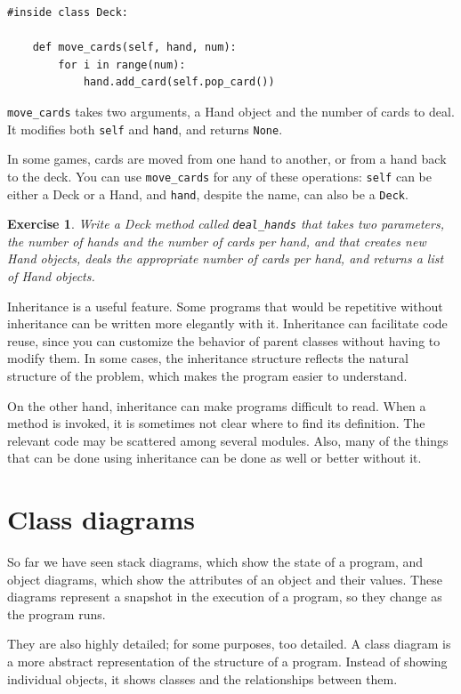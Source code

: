 \documentclass[12pt,a4paper,final,twoside,onecolumn,titlepage]{book}
\newtheorem{exercise}{Exercise}[chapter]
\begin{document}
\begin{verbatim}
#inside class Deck:

    def move_cards(self, hand, num):
        for i in range(num):
            hand.add_card(self.pop_card())
\end{verbatim}
%
\verb"move_cards" takes two arguments, a Hand object and the number of
cards to deal.  It modifies both {\tt self} and {\tt hand}, and
returns {\tt None}.

In some games, cards are moved from one hand to another,
or from a hand back to the deck.  You can use \verb"move_cards"
for any of these operations: {\tt self} can be either a Deck
or a Hand, and {\tt hand}, despite the name, can also be a {\tt Deck}.

\begin{exercise}

Write a Deck method called \verb"deal_hands" that takes two
parameters, the number of hands and the number of cards per
hand, and that creates new Hand objects, deals the appropriate
number of cards per hand, and returns a list of Hand objects.

\end{exercise}

Inheritance is a useful feature.  Some programs that would be
repetitive without inheritance can be written more elegantly
with it.  Inheritance can facilitate code reuse, since you can
customize the behavior of parent classes without having to modify
them.  In some cases, the inheritance structure reflects the natural
structure of the problem, which makes the program easier to
understand.

On the other hand, inheritance can make programs difficult to read.
When a method is invoked, it is sometimes not clear where to find its
definition.  The relevant code may be scattered among several modules.
Also, many of the things that can be done using inheritance can be
done as well or better without it.  


\section{Class diagrams}
\label{class.diagram}

So far we have seen stack diagrams, which show the state of
a program, and object diagrams, which show the attributes
of an object and their values.  These diagrams represent a snapshot
in the execution of a program, so they change as the program
runs.

They are also highly detailed; for some purposes, too
detailed.  A class diagram is a more abstract representation
of the structure of a program.  Instead of showing individual
objects, it shows classes and the relationships between them.
\end{document}
